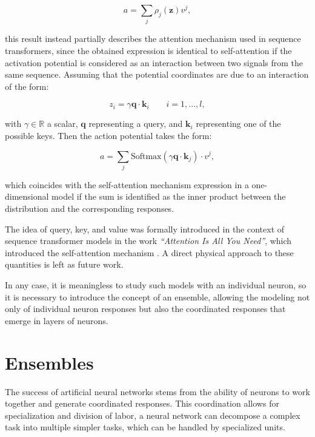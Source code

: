 \documentclass[12pt]{article}
\begin{document}
\begin{equation}
a = \sum_j \rho_j(\mathbf{z}) v^j,
\end{equation}

this result instead partially describes the attention mechanism used in sequence transformers, since the obtained expression is identical to self-attention if the activation potential is considered as an interaction between two signals from the same sequence. Assuming that the potential coordinates are due to an interaction of the form:

\begin{equation}
z_i = \gamma \mathbf{q} \cdot \mathbf{k}_i \qquad i = 1, \dots, l,
\end{equation}

with $\gamma \in \mathbb{R}$ a scalar, $\mathbf{q}$ representing a query, and $\mathbf{k}_i$ representing one of the possible keys. Then the action potential takes the form:

\begin{equation}
a = \sum_j \text{Softmax}(\gamma \mathbf{q} \cdot \mathbf{k}_j) \cdot v^j,
\end{equation}

which coincides with the self-attention mechanism expression in a one-dimensional model if the sum is identified as the inner product between the distribution and the corresponding responses.

The idea of query, key, and value was formally introduced in the context of sequence transformer models in the work \emph{“Attention Is All You Need”}, which introduced the self-attention mechanism \cite{vaswani2017attention}. A direct physical approach to these quantities is left as future work.

In any case, it is meaningless to study such models with an individual neuron, so it is necessary to introduce the concept of an ensemble, allowing the modeling not only of individual neuron responses but also the coordinated responses that emerge in layers of neurons.
\section*{Ensembles}

The success of artificial neural networks stems from the ability of neurons to work together and generate coordinated responses. This coordination allows for specialization and division of labor, a neural network can decompose a complex task into multiple simpler tasks, which can be handled by specialized units.
\end{document}

